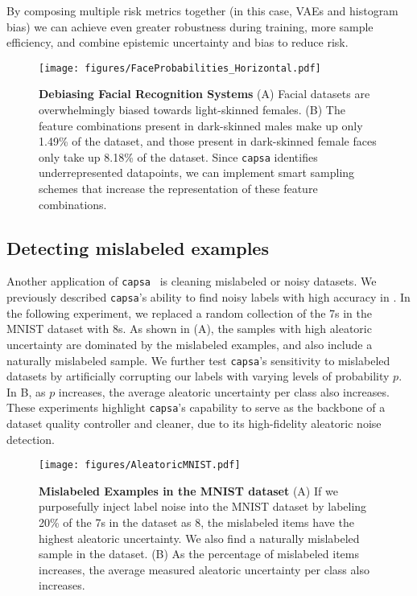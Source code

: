 \documentclass{article} %
\def\capsa{\texttt{{capsa}}}
\newcommand{\todo}[1]{\textcolor{red}{[\textbf{TODO}: #1]}}
\begin{document}
By composing multiple risk metrics together (in this case, VAEs and histogram bias) we can achieve even greater robustness during training, more sample efficiency, and combine epistemic uncertainty and bias to reduce risk.

\begin{figure}[t!]
\centering
\texttt{[image: figures/FaceProbabilities\_Horizontal.pdf]}
\caption{\textbf{Debiasing Facial Recognition Systems} (A) Facial datasets are overwhelmingly biased towards light-skinned females. (B) The feature combinations present in dark-skinned males make up only 1.49\% of the dataset, and those present in dark-skinned female faces only take up 8.18\% of the dataset. Since \capsa{} identifies underrepresented datapoints, we can implement smart sampling schemes that increase the representation of these feature combinations.}
\label{fig:face-probabilities}
\end{figure}


\subsection{Detecting mislabeled examples}
Another application of \capsa~ is cleaning mislabeled or noisy datasets. We previously described \capsa's ability to find noisy labels with high accuracy in . In the following experiment, we replaced a random collection of the 7s in the MNIST dataset with 8s. As shown in (A), the samples with high aleatoric uncertainty are dominated by the mislabeled examples, and also include a naturally mislabeled sample. 
We further test \capsa's sensitivity to mislabeled datasets by artificially corrupting our labels with varying levels of probability $p$. In B, as $p$ increases, the average aleatoric uncertainty per class also increases. These experiments highlight \capsa's capability to serve as the backbone of a dataset quality controller and cleaner, due to its high-fidelity aleatoric noise detection.


\begin{figure*}[t!]
\centering
\texttt{[image: figures/AleatoricMNIST.pdf]}
\caption{\textbf{Mislabeled Examples in the MNIST dataset} (A) If we purposefully inject label noise into the MNIST dataset by labeling 20\% of the 7s in the dataset as 8, the mislabeled items have the highest aleatoric uncertainty. We also find a naturally mislabeled sample in the dataset. (B) As the percentage of mislabeled items increases, the average measured aleatoric uncertainty per class also increases.}
\label{fig:aleatoric-mnist}
\end{figure*}
\end{document}
